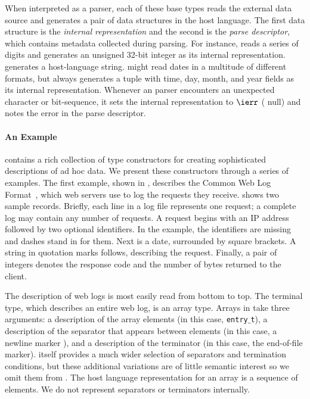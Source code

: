 When interpreted as a parser, each of these base types reads
the external data source and generates a pair of data structures
in the host language.  The first data structure is the
{\em internal representation}  and
the second is the {\em parse descriptor}, which contains metadata collected during parsing.
For instance, \Puint{} reads a series of digits and generates an unsigned 32-bit integer as its
internal representation.  \Pstring{} generates a 
host-language string.  
\Pdate{} might read dates in a multitude of
different formats, but always generates a tuple
with time, day, month, and year fields as its internal 
representation.  Whenever an \ipads{} parser encounters
an unexpected character or bit-sequence, it sets the internal representation to
$\ierr$ (\ie{} null) and notes the error in the
parse descriptor.

\paragraph*{An \ipads{} Example}
\ipads{} contains a rich collection of type constructors for creating
sophisticated descriptions of ad hoc data.  We present these
constructors through a series of examples.  The first example, shown
in , describes the Common Web
Log Format~\cite{wpp}, which web servers use to log the requests they
receive.   shows two sample
records.  Briefly, each line in a log file represents one request;
a complete log may contain any number of requests.  A request begins
with an IP address followed by two optional identifiers.  In the
example, the identifiers are missing and dashes stand in for them.  Next is a date,
surrounded by square brackets.  A string in
quotation marks follows, describing the request.  Finally,
a pair of integers denotes the response code and the
number of bytes returned to the client.

The \ipads{} description of web logs is most easily read from bottom to top.
The terminal type, which describes an entire web log, is an array type.
Arrays in \ipads{} take three arguments: a description
of the array elements (in this case, {\tt entry$\_$t}),
a description of the separator that appears between elements
(in this case, a newline marker \Peor{}), and 
a description of the terminator (in this case, the end-of-file marker).
\padsc{} itself provides a much wider selection of separators and
termination conditions, but these additional variations are of little semantic 
interest so we omit them from \ipads.  
The host language representation for 
an array is a sequence of elements. We do not represent separators or terminators internally.

